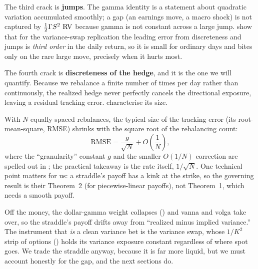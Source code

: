 The third crack is \textbf{jumps}. The gamma identity is a statement about quadratic variation accumulated smoothly; a gap (an earnings move, a macro shock) is not captured by $\tfrac12\Gamma S^2 \,\operatorname{RV}$ because gamma is not constant across a large jump. \citet{CarrLee2009} show that for the variance-swap replication the leading error from discreteness and jumps is \emph{third order} in the daily return, so it is small for ordinary days and bites only on the rare large move, precisely when it hurts most.

The fourth crack is \textbf{discreteness of the hedge}, and it is the one we will quantify. Because we rebalance a finite number of times per day rather than continuously, the realized hedge never perfectly cancels the directional exposure, leaving a residual tracking error. \citet{BertsimasKoganLo2000} characterise its size.

\begin{keyidea}
With $N$ equally spaced rebalances, the typical size of the tracking error (its root-mean-square, RMSE) shrinks with the square root of the rebalancing count:
\begin{equation}
\label{eq:ivrv:bkl-rmse}
\text{RMSE} = \frac{g}{\sqrt{N}} + O\!\left(\frac{1}{N}\right),
\end{equation}
where the ``granularity'' constant $g$ and the smaller $O(1/N)$ correction are spelled out in \citet[Thm.~1c, Eqs.~2.13, 2.18]{BertsimasKoganLo2000}; the practical takeaway is the rate itself, $1/\sqrt{N}$. One technical point matters for us: a straddle's payoff has a kink at the strike, so the governing result is their Theorem~2 (for piecewise-linear payoffs), not Theorem~1, which needs a smooth payoff.
\end{keyidea}

\begin{warning}
Off the money, the dollar-gamma weight collapses () and vanna and volga take over, so the straddle's payoff drifts away from ``realized minus implied variance.'' The instrument that \emph{is} a clean variance bet is the variance swap, whose $1/K^2$ strip of options () holds its variance exposure constant regardless of where spot goes. We trade the straddle anyway, because it is far more liquid, but we must account honestly for the gap, and the next sections do.
\end{warning}

